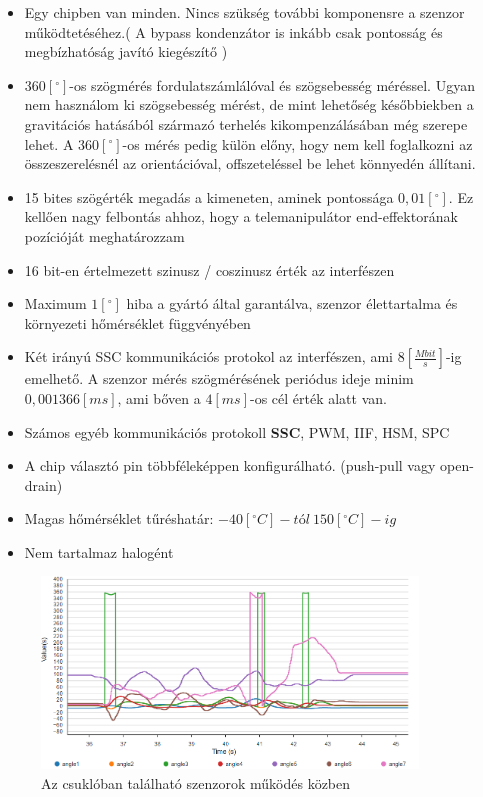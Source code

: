 \begin{itemize}
	\item Egy chipben van minden. Nincs szükség további komponensre a szenzor működtetéséhez.( A bypass kondenzátor is inkább csak pontosság és megbízhatóság javító kiegészítő )
	\item $360[^\circ]$-os szögmérés fordulatszámlálóval és szögsebesség méréssel. Ugyan nem használom ki szögsebesség mérést, de mint lehetőség későbbiekben a gravitációs hatásából származó terhelés kikompenzálásában még szerepe lehet. A $360[^\circ]$-os mérés pedig külön előny, hogy nem kell foglalkozni az összeszerelésnél az orientációval, offszeteléssel be lehet könnyedén állítani.
	\item 15 bites szögérték megadás a kimeneten, aminek pontossága $0,01[^\circ]$. Ez kellően nagy felbontás ahhoz, hogy a telemanipulátor end-effektorának pozícióját meghatározzam
	\item 16 bit-en értelmezett szinusz / coszinusz érték az interfészen
	\item Maximum $1[^\circ]$ hiba a gyártó által garantálva, szenzor élettartalma és környezeti hőmérséklet függvényében
	\item Két irányú SSC kommunikációs protokol az interfészen, ami $8[\frac{Mbit}{s}]$-ig emelhető. A szenzor mérés szögmérésének periódus ideje minim $0,001366[ms]$, ami bőven a $4[ms]$-os cél érték alatt van.
	\item Számos egyéb kommunikációs protokoll \textbf{SSC}, PWM, IIF, HSM, SPC
	\item A chip választó pin többféleképpen konfigurálható. (push-pull vagy open-drain)
 	\item Magas hőmérséklet tűréshatár: $-40[^\circ C]-tól~150[^\circ C]-ig$
	\item Nem tartalmaz halogént
\end{itemize}

\begin{figure}[!ht]
\centering
\includegraphics[width=100mm, keepaspectratio]{figures/Csuklo_szog_teszt/szumma}
\caption{Az csuklóban található szenzorok működés közben}
\label{fig:csuklo_teszt_szumma}
\end{figure}

